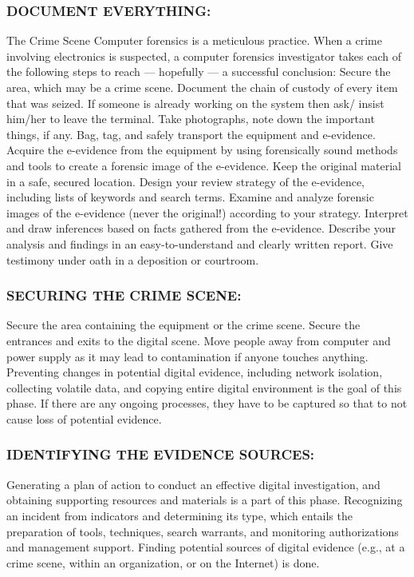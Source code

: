 \documentclass[10pt,british,english]{article}
\begin{document}
\subsubsection{DOCUMENT EVERYTHING:}

The Crime Scene Computer forensics is a meticulous practice. When
a crime involving electronics is suspected, a computer forensics investigator
takes each of the following steps to reach --- hopefully --- a successful
conclusion: Secure the area, which may be a crime scene. Document
the chain of custody of every item that was seized. If someone is
already working on the system then ask/ insist him/her to leave the
terminal. Take photographs, note down the important things, if any.
Bag, tag, and safely transport the equipment and e-evidence. Acquire
the e-evidence from the equipment by using forensically sound methods
and tools to create a forensic image of the e-evidence. Keep the original
material in a safe, secured location. Design your review strategy
of the e-evidence, including lists of keywords and search terms. Examine
and analyze forensic images of the e-evidence (never the original!)
according to your strategy. Interpret and draw inferences based on
facts gathered from the e-evidence. Describe your analysis and findings
in an easy-to-understand and clearly written report. Give testimony
under oath in a deposition or courtroom. 

\subsubsection{SECURING THE CRIME SCENE:}

Secure the area containing the equipment or the crime scene. Secure
the entrances and exits to the digital scene. Move people away from
computer and power supply as it may lead to contamination if anyone
touches anything. Preventing changes in potential digital evidence,
including network isolation, collecting volatile data, and copying
entire digital environment is the goal of this phase. If there are
any ongoing processes, they have to be captured so that to not cause
loss of potential evidence.

\subsubsection{IDENTIFYING THE EVIDENCE SOURCES:}

Generating a plan of action to conduct an effective digital investigation,
and obtaining supporting resources and materials is a part of this
phase. Recognizing an incident from indicators and determining its
type, which entails the preparation of tools, techniques, search warrants,
and monitoring authorizations and management support. Finding potential
sources of digital evidence (e.g., at a crime scene, within an organization,
or on the Internet) is done.
\end{document}
